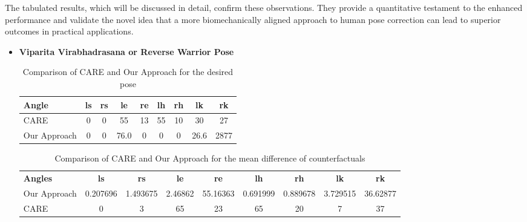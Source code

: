 The tabulated results, which will be discussed in detail, confirm these observations. They provide a quantitative testament to the enhanced performance and validate the novel idea that a more biomechanically aligned approach to human pose correction can lead to superior outcomes in practical applications.
\begin{itemize}
\item \textbf{Viparita Virabhadrasana or Reverse Warrior Pose} \newline

\begin{table}[h!]
\centering
\begin{tabular}{|m{3.5cm}|c|c|c|c|c|c|c|c|}
\hline
\rowcolor[HTML]{FFCCC9} %
\textbf{Angle} & \textbf{ls} & \textbf{rs} & \textbf{le} & \textbf{re} & \textbf{lh} & \textbf{rh} & \textbf{lk} & \textbf{rk} \\ \hline
CARE & 0 & 0 & 55 & 13 & 55 & 10 & 30 & 27 \\ \hline
Our Approach & 0 & 0 & 76.0 & 0 & 0 & 0 & 26.6 & 2877 \\ \hline
\end{tabular}
\caption{Comparison of CARE and Our Approach for the desired pose}
\end{table}

\begin{table}[h!]
\centering
\begin{tabular}{|m{3.5cm}|c|c|c|c|c|c|c|c|}
\hline
\rowcolor[HTML]{FFCCC9}
\multicolumn{9}{|c|}{\textbf{Mean of difference of Counterfactuals}} \\ \hline
\rowcolor[HTML]{FFCCC9} 
\textbf{Angles} & \textbf{ls} & \textbf{rs} & \textbf{le} & \textbf{re} & \textbf{lh} & \textbf{rh} & \textbf{lk} & \textbf{rk} \\ \hline
Our Approach & 0.207696 & 1.493675 & 2.46862 & 55.16363 & 0.691999 & 0.889678 & 3.729515 & 36.62877 \\ \hline
CARE & 0 & 3 & 65 & 23 & 65 & 20 & 7 & 37 \\ \hline
\end{tabular}
\caption{Comparison of CARE and Our Approach for the mean difference of counterfactuals}
\end{table}


\end{itemize}
